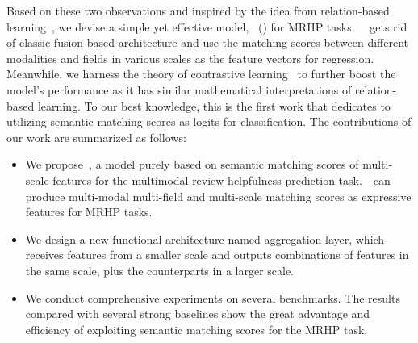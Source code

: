 Based on these two observations and inspired by the idea from relation-based learning~\cite{snell2017prototypical,sung2018learning}, we devise a simple yet effective model, \modelname~(\modelfullname) for MRHP tasks.
~\modelname~gets rid of classic fusion-based architecture and 
use the matching scores between different modalities and fields in various scales as the feature vectors for regression.
Meanwhile, we harness the theory of contrastive learning~\cite{oord2018representation,he2020momentum,chen2020simple} to further boost the model's performance as it has similar mathematical interpretations of relation-based learning. 
To our best knowledge, this is the first work that dedicates to utilizing semantic matching scores as logits for classification.
The contributions of our work are summarized as follows:
\begin{itemize}
    \item We propose~\modelname, a model purely based on semantic matching scores of multi-scale features for the multimodal review helpfulness prediction task.~\modelname~can produce multi-modal multi-field and multi-scale matching scores as expressive features for MRHP tasks.
    \item We design a new functional architecture named aggregation layer, which receives features from a smaller scale and outputs combinations of features in the same scale, plus the counterparts in a larger scale.
    \item We conduct comprehensive experiments on several benchmarks. The results compared with several strong baselines show the great advantage and efficiency of exploiting semantic matching scores for the MRHP task. 
\end{itemize}